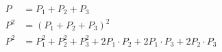 \begin{subequations}
\begin{align}
P&=P_1+P_2+P_3 \\
P^2 &= (P_1+P_2+P_3)^2 \nonumber \\
P^2 &= P_1^2 +P_2^2 + P_3^2 + 2 P_1 \cdot P_2 + 2 P_1 \cdot P_3 + 2 P_2 \cdot P_3
\end{align}
\end{subequations}
